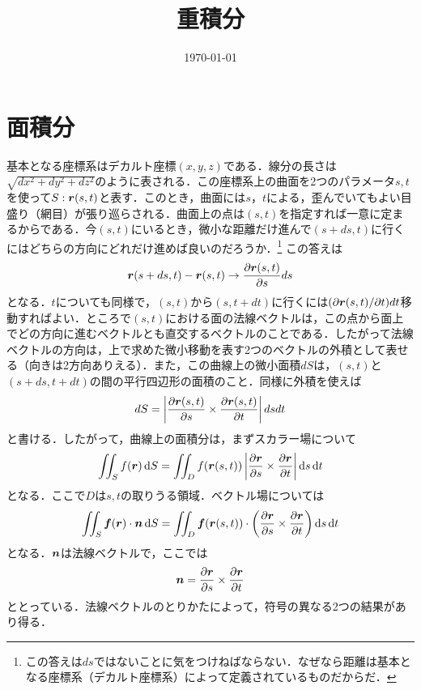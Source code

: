 \documentclass[a4paper,10pt,uplatex]{jsarticle}
\begin{document}
\title{重積分}
\author{}
\date{\today}
\maketitle

\section*{面積分}
基本となる座標系はデカルト座標$(x,y,z)$である．線分の長さは$\sqrt{dx^2+dy^2+dz^2}$のように表される．この座標系上の曲面を2つのパラメータ$s,t$を使って$S:\vb*{r}(s,t)$と表す．このとき，曲面には$s$，$t$による，歪んでいてもよい目盛り（網目）が張り巡らされる．曲面上の点は$(s,t)$を指定すれば一意に定まるからである．今$(s,t)$にいるとき，微小な距離だけ進んで$(s+ds,t)$に行くにはどちらの方向にどれだけ進めば良いのだろうか．\footnote{この答えは$ds$ではないことに気をつけねばならない．なぜなら距離は基本となる座標系（デカルト座標系）によって定義されているものだからだ．}
この答えは
\begin{equation}
    \vb*{r}(s+ds,t) - \vb*{r}(s,t) \to \pdv{\vb*{r}(s,t)}{s} ds
\end{equation}
となる．$t$についても同様で，$(s,t)$から$(s,t+dt)$に行くには$(\partial\vb*{r}(s,t)/\partial t)dt$移動すればよい．ところで$(s,t)$における面の法線ベクトルは，この点から面上でどの方向に進むベクトルとも直交するベクトルのことである．したがって法線ベクトルの方向は，上で求めた微小移動を表す2つのベクトルの外積として表せる（向きは2方向ありえる）．また，この曲線上の微小面積$dS$は，$(s,t)$と$(s+ds,t+dt)$の間の平行四辺形の面積のこと．同様に外積を使えば
\begin{equation}
    dS = \left|\pdv{\vb*{r}(s,t)}{s} \times \pdv{\vb*{r}(s,t)}{t}\right|dsdt
\end{equation}
と書ける．したがって，曲線上の面積分は，まずスカラー場について
\begin{equation}
    \iint_S f(\vb*{r}) \dd{S} = \iint_D f(\vb*{r}(s,t)) \left|\pdv{\vb*{r}}{s} \times \pdv{\vb*{r}}{t}\right|\dd{s}\dd{t}
\end{equation}
となる．ここで$D$は$s,t$の取りうる領域．ベクトル場については
\begin{equation}
    \iint_S \vb*{f}(\vb*{r}) \cdot \vb*{n} \dd{S} = \iint_D \vb*{f}(\vb*{r}(s,t)) \cdot \left( \pdv{\vb*{r}}{s} \times \pdv{\vb*{r}}{t}\right) \dd{s}\dd{t}
\end{equation}
となる．$\vb*{n}$は法線ベクトルで，ここでは
\begin{equation}
    \vb*{n} = \pdv{\vb*{r}}{s} \times \pdv{\vb*{r}}{t}
\end{equation}
ととっている．法線ベクトルのとりかたによって，符号の異なる2つの結果があり得る．
\end{document}
